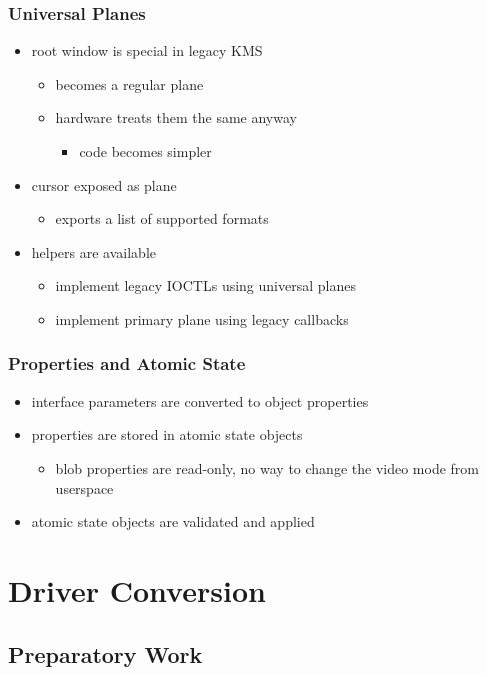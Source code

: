 \documentclass[t]{beamer}
\begin{document}
\begin{frame}
	\frametitle{Universal Planes}
	\begin{itemize}
		\item root window is special in legacy KMS
			\begin{itemize}
				\item becomes a regular plane
				\item hardware treats them the same anyway
					\begin{itemize}
						\item code becomes simpler
					\end{itemize}
			\end{itemize}
		\item cursor exposed as plane
			\begin{itemize}
				\item exports a list of supported formats
			\end{itemize}
		\item helpers are available
			\begin{itemize}
				\item implement legacy IOCTLs using universal planes
				\item implement primary plane using legacy callbacks
			\end{itemize}
	\end{itemize}
\end{frame}

\begin{frame}
	\frametitle{Properties and Atomic State}
	\begin{itemize}
		\item interface parameters are converted to object properties
		\item properties are stored in atomic state objects
			\begin{itemize}
				\item blob properties are read-only, no way to change the
					video mode from userspace
			\end{itemize}
		\item atomic state objects are validated and applied
	\end{itemize}
\end{frame}

\section{Driver Conversion}

\subsection{Preparatory Work}
\end{document}
